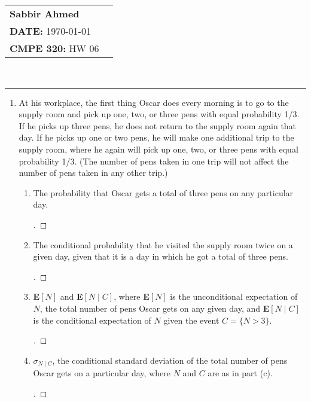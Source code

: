\documentclass[paper=usletter, fontsize=12pt]{article}
\newcommand{\documentinfo}[5]{
    \begin{centering}
        \parbox{2in}{
        \begin{spacing}{1}
            \begin{flushleft}
                \begin{tabular}{l l}
                    \textbf{#1} \\
                    \textbf{DATE:} #2 \\
                    #3 \\
                \end{tabular}\\
                \rule{\textwidth}{1pt}
            \end{flushleft}
        \end{spacing}
        }
    \end{centering}
}
\newenvironment{cproof}{\begin{proof}[\unskip\nopunct]}{\end{proof}}
\begin{document}
    \documentinfo{Sabbir Ahmed}{\today}{\textbf{CMPE 320:} HW 06}
    \vspace{-0.2in}

    \begin{enumerate}

        \item
        At his workplace, the first thing Oscar does every morning is to go to
        the supply room and pick up one, two, or three pens with equal
        probability 1/3. If he picks up three pens, he does not return to the
        supply room again that day. If he picks up one or two pens, he will
        make one additional trip to the supply room, where he again will pick
        up one, two, or three pens with equal probability 1/3. (The number of
        pens taken in one trip will not affect the number of pens taken in any
        other trip.)

        \begin{enumerate}[label=\textbf{\alph*}]

            \item The probability that Oscar gets a total of three pens on any
            particular day.
            \begin{cproof}
            \end{cproof}

            \item The conditional probability that he visited the supply room
            twice on a given day, given that it is a day in which he got a
            total of three pens.
            \begin{cproof}
            \end{cproof}

            \item \textbf{E}$[N]$ and \textbf{E}$[N \mid C]$, where
            \textbf{E}$[N]$ is the unconditional expectation of $N$, the total
            number of pens Oscar gets on any given day, and \textbf{E}$[N \mid
            C]$ is the conditional expectation of $N$ given the event
            $C=\{N>3\}$.
            \begin{cproof}
            \end{cproof}

            \item $\sigma_{N \mid C}$, the conditional standard deviation of
            the total number of pens Oscar gets on a particular day, where $N$
            and $C$ are as in part (c).
            \begin{cproof}
            \end{cproof}


\end{enumerate}
\end{enumerate}
\end{document}
